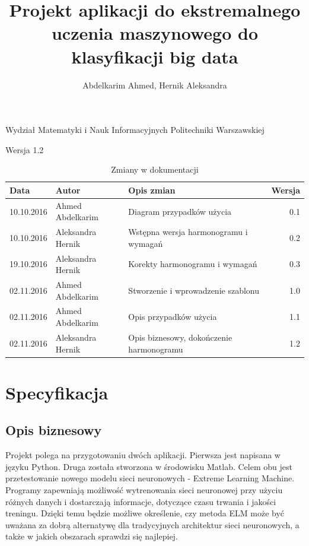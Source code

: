 \documentclass{article}
\title{Projekt aplikacji do ekstremalnego uczenia maszynowego do klasyfikacji big data}
\author{Abdelkarim Ahmed, Hernik Aleksandra}
\begin{document}
Wydział Matematyki i Nauk Informacyjnych Politechniki Warszawskiej
\vspace*{\fill}
\begin{center}
\begin{minipage}{.9\textwidth}
\maketitle
\begin{center}Wersja 1.2\end{center}
\end{minipage}
\end{center}
\vfill %
\clearpage
\noindent
\begin{table}[H]
\caption{Zmiany w dokumentacji}
\hspace*{-1cm}
\begin{tabular}{|l|l|l|r|}
\hline
\textbf{Data} & \textbf{Autor} & \textbf{Opis zmian} & \textbf{Wersja} \\
\hline
10.10.2016 & Ahmed Abdelkarim & Diagram przypadków użycia & 0.1 \\
10.10.2016 & Aleksandra Hernik & Wstępna wersja harmonogramu i wymagań & 0.2 \\
19.10.2016 & Aleksandra Hernik & Korekty harmonogramu i wymagań & 0.3 \\
02.11.2016 & Ahmed Abdelkarim & Stworzenie i wprowadzenie szablonu & 1.0 \\
02.11.2016 & Ahmed Abdelkarim & Opis przypadków użycia & 1.1 \\
02.11.2016 & Aleksandra Hernik & Opis biznesowy, dokończenie harmonogramu & 1.2 \\
\hline
\end{tabular}
\end{table}
\tableofcontents
\clearpage
\section{Specyfikacja}
\subsection{Opis biznesowy}
Projekt polega na przygotowaniu dwóch aplikacji. Pierwsza jest napisana w języku Python. Druga została stworzona w środowisku Matlab. Celem obu jest przetestowanie nowego modelu sieci neuronowych - Extreme Learning Machine. Programy zapewniają możliwość wytrenowania sieci neuronowej przy użyciu różnych danych i dostarczają informacje, dotyczące czasu trwania i jakości treningu. Dzięki temu będzie możliwe określenie, czy metoda ELM może być uważana za dobrą alternatywę dla tradycyjnych architektur sieci neuronowych, a także w jakich obszarach sprawdzi się najlepiej.
\end{document}
